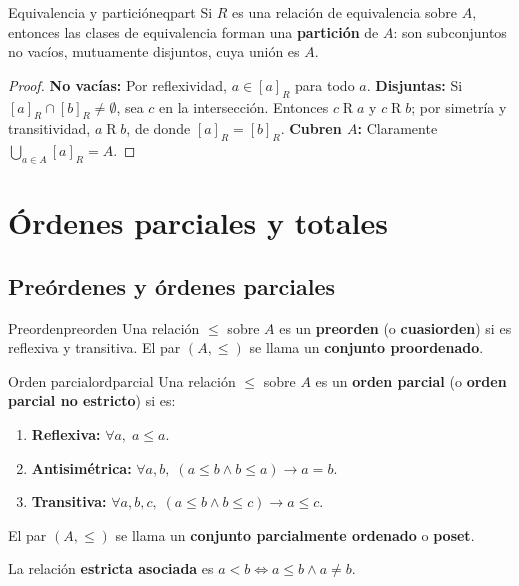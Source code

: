 \begin{proposicion}{Equivalencia y partición}{eqpart}
Si $R$ es una relación de equivalencia sobre $A$, entonces las clases de equivalencia forman una \textbf{partición} de $A$: son subconjuntos no vacíos, mutuamente disjuntos, cuya unión es $A$.
\end{proposicion}

\begin{proof}
\textbf{No vacías:} Por reflexividad, $a \in [a]_R$ para todo $a$. \quad \textbf{Disjuntas:} Si $[a]_R \cap [b]_R \neq \emptyset$, sea $c$ en la intersección. Entonces $c \mathrel{R} a$ y $c \mathrel{R} b$; por simetría y transitividad, $a \mathrel{R} b$, de donde $[a]_R = [b]_R$. \quad \textbf{Cubren $A$:} Claramente $\bigcup_{a \in A} [a]_R = A$.
\end{proof}

\section{Órdenes parciales y totales}

\subsection{Preórdenes y órdenes parciales}

\begin{definicion}{Preorden}{preorden}
Una relación $\leq$ sobre $A$ es un \textbf{preorden} (o \textbf{cuasiorden}) si es reflexiva y transitiva. El par $(A, \leq)$ se llama un \textbf{conjunto proordenado}.
\end{definicion}

\begin{definicion}{Orden parcial}{ordparcial}
Una relación $\leq$ sobre $A$ es un \textbf{orden parcial} (o \textbf{orden parcial no estricto}) si es:
\begin{enumerate}[leftmargin=2em, label=(\roman*)]
  \item \textbf{Reflexiva:} $\forall a,\; a \leq a$.
  \item \textbf{Antisimétrica:} $\forall a,b,\; (a \leq b \wedge b \leq a) \to a = b$.
  \item \textbf{Transitiva:} $\forall a,b,c,\; (a \leq b \wedge b \leq c) \to a \leq c$.
\end{enumerate}
El par $(A, \leq)$ se llama un \textbf{conjunto parcialmente ordenado} o \textbf{poset}.

La relación \textbf{estricta asociada} es $a < b \iff a \leq b \wedge a \neq b$.
\end{definicion}

